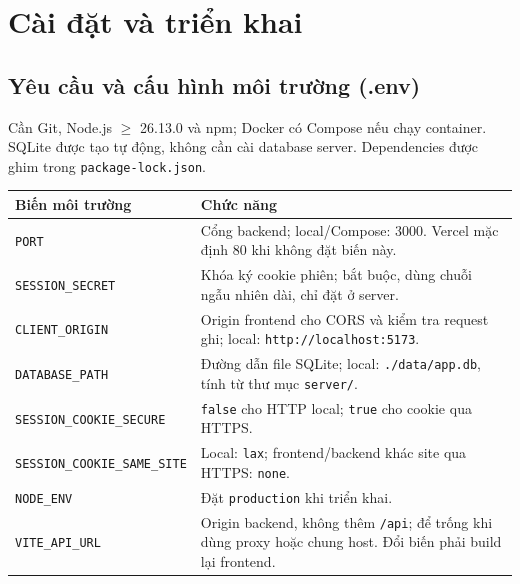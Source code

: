 \section{Cài đặt và triển khai}

\subsection{Yêu cầu và cấu hình môi trường (.env)}
Cần Git, Node.js $\geq$ 26.13.0 và npm; Docker có Compose nếu chạy container. SQLite được tạo tự động, không cần cài database server. Dependencies được ghim trong \texttt{package-lock.json}.

\begin{tabularx}{\linewidth}{@{}lX@{}}
\toprule
\textbf{Biến môi trường} & \textbf{Chức năng} \\
\midrule
\texttt{PORT} & Cổng backend; local/Compose: 3000. Vercel mặc định 80 khi không đặt biến này. \\
\texttt{SESSION\_SECRET} & Khóa ký cookie phiên; bắt buộc, dùng chuỗi ngẫu nhiên dài, chỉ đặt ở server. \\
\texttt{CLIENT\_ORIGIN} & Origin frontend cho CORS và kiểm tra request ghi; local: \texttt{http://localhost:5173}. \\
\texttt{DATABASE\_PATH} & Đường dẫn file SQLite; local: \texttt{./data/app.db}, tính từ thư mục \texttt{server/}. \\
\texttt{SESSION\_COOKIE\_SECURE} & \texttt{false} cho HTTP local; \texttt{true} cho cookie qua HTTPS. \\
\texttt{SESSION\_COOKIE\_SAME\_SITE} & Local: \texttt{lax}; frontend/backend khác site qua HTTPS: \texttt{none}. \\
\texttt{NODE\_ENV} & Đặt \texttt{production} khi triển khai. \\
\texttt{VITE\_API\_URL} & Origin backend, không thêm \texttt{/api}; để trống khi dùng proxy hoặc chung host. Đổi biến phải build lại frontend. \\
\bottomrule
\end{tabularx}

